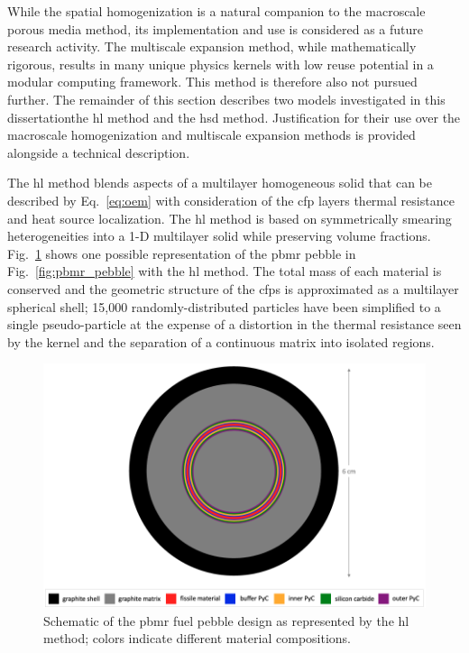 While the spatial homogenization is a natural companion to the macroscale porous media method, its implementation and use is considered as a future research activity. The multiscale expansion method, while mathematically rigorous, results in many unique physics kernels with low reuse potential in a modular computing framework. This method is therefore also not pursued further. The remainder of this section describes two models investigated in this dissertation\mdash the \gls{hl} method and the \gls{hsd} method. Justification for their use over the macroscale homogenization and multiscale expansion methods is provided alongside a technical description.

The \gls{hl} method blends aspects of a multilayer homogeneous solid that can be described by Eq.\ \eqref{eq:oem} with consideration of the \gls{cfp} layers thermal resistance and heat source localization. The \gls{hl} method is based on symmetrically smearing heterogeneities into a 1-D multilayer solid while preserving volume fractions. Fig.\ \ref{fig:pbmr_hlm} shows one possible representation of the \gls{pbmr} pebble in Fig.\ \ref{fig:pbmr_pebble} with the \gls{hl} method. The total mass of each material is conserved and the geometric structure of the \glspl{cfp} is approximated as a multilayer spherical shell; 15,000 randomly-distributed particles have been simplified to a single pseudo-particle at the expense of a distortion in the thermal resistance seen by the kernel and the separation of a continuous matrix into isolated regions.

\begin{figure}[!h]
\centering
  \includegraphics[width=0.85\linewidth]{figs/pbmr_hlm.png}
\caption{Schematic of the \gls{pbmr} fuel pebble design as represented by the \gls{hl} method; colors indicate different material compositions.}
\label{fig:pbmr_hlm}
\end{figure}

